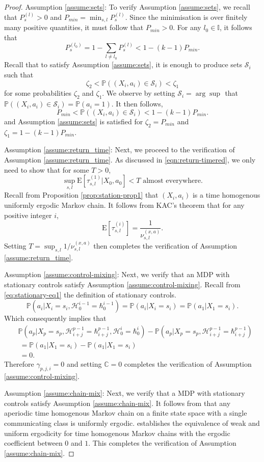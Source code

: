 \documentclass[opre,sglanonrev]{informs4}
\numberwithin{equation}{section}
\newcommand{\pow}[1]{^{(#1)}}
\newcommand{\lp}{\left(}
\newcommand{\rp}{\right)}
\newcommand{\E}{\mathrm{E}}
\newcommand{\History}{\mathcal{H}}
\newcommand{\history}{\hbar}
\newcommand{\Cbb}{\mathbb{C}}
\newcommand{\Ibb}{\mathbb{I}}
\newcommand{\Pbb}{\mathbb{P}}
\newcommand{\Scal}{\mathcal{S}}
\newcommand{\constant}{\Cbb}
\newcommand{\prob}{\Pbb}
\newcommand{\probl}{\prob}
\begin{document}
\begin{APPENDICES}
\begin{proof}
\noindent Assumption \ref{assume:sets}: To verify Assumption \ref{assume:sets}, we recall that $P_s\pow{l}>0$ and $P_{min}=\min_{s,l} P_s\pow{l}$. 
Since the minimisation is over finitely many positive quantities, it must follow that $P_{min}>0$. For any $l_0\in\Ibb$, it follows that 
\[
P_s\pow{l_0}=1-\sum_{l\neq l_0}P_s\pow{l}<1-(k-1)P_{min}.
\]
Recall that to satisfy Assumption \ref{assume:sets}, it is enough to produce sets $\Scal_i$ such that
\[
\zeta_2<\prob\lp (X_i,a_i)\in \Scal_i \rp<\zeta_1 
\]
for some probabilities $\zeta_2$ and $\zeta_1$.
We observe by setting $\Scal_i=\arg\sup_{}$ that $\prob\lp (X_i,a_i)\in \Scal_i \rp=\prob\lp a_i=1 \rp$. It then follows, 
\[
P_{min}<\prob\lp (X_i,a_i)\in \Scal_i \rp<1-(k-1)P_{min}.
\]
and Assumption \ref{assume:sets} is satisfied for $\zeta_2=P_{min}$ and $\zeta_1=1-(k-1)P_{min}$.

\noindent Assumption \ref{assume:return_time}: Next, we proceed to the verification of {Assumption \ref{assume:return_time}}. As discussed in \cref{eqn:return-timered}, we only need to show that for some $T>0$,
\[
\sup_{s,l}\E[\tau^{(1)}_{s,l}|X_0,a_0] < T \text{ almost everywhere.}
\]
Recall from Proposition \ref{prop:station-prop1} that $(X_i,a_i)$ is a time homogenous uniformly ergodic Markov chain. It follows from KAC's theorem \citep[Theorem 10.2.2]{meyntweedie} that for any positive integer $i$,
\[
\E[\tau^{(i)}_{s,l}]=\frac{1}{\nu_{s,l}^{(x,a)}}.
\] 
Setting $T=\sup_{s,l} {1}/{\nu_{s,l}^{(x,a)}}$ then completes the verification of Assumption \ref{assume:return_time}. 

\noindent Assumption \ref{assume:control-mixing}: Next, we verify that an MDP with stationary controls satisfy {Assumption \ref{assume:control-mixing}.} Recall from \cref{eq:stationary-eq1} the definition of stationary controls.
\[
\probl\lp a_i|X_i=s_i,\History_0^{i-1}=\history_0^{i-1}\rp=\probl\lp a_i|X_i=s_i \rp=\probl\lp a_1|X_1=s_i \rp.
\]
Which consequently implies that
\begin{align*}
    &\probl\lp a_p|X_p=s_p,\History_{i+j}^{p-1}=\history_{i+j}^{p-1},\History_0^i=\history_{0}^{i}\rp-\probl\lp a_p|X_p=s_p,\History_{i+j}^{p-1}=\history_{i+j}^{p-1}\rp\\
    & \ = \probl\lp a_1|X_1=s_i \rp - \probl\lp a_1|X_1=s_i \rp\\
    & \ = 0.
\end{align*}
Therefore $\gamma_{p,j,i}=0$ and setting $\constant=0$ completes the verification of Assumption \ref{assume:control-mixing}. 

\noindent Assumption \ref{assume:chain-mix}: Next, we verify that a MDP with stationary controls satisfy {Assumption \ref{assume:chain-mix}.} It follows from \citet[Theorem 16.0.2]{meyntweedie} that any aperiodic time homogenous Markov chain on a finite state space with a single communicating class is uniformly ergodic. \citet[Theorem 3.4]{mukhamedov2013dobrushin} establishes the equivalence of weak and uniform ergodicity for time homogenous Markov chains with the ergodic coefficient between $0$ and $1$. This completes the verification of Assumption \ref{assume:chain-mix}.


\end{proof}
\end{APPENDICES}
\end{document}
